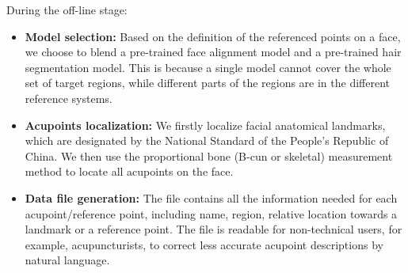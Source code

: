 During the off-line stage:
\begin{itemize}
\item \textbf{Model selection:} Based on the definition of the referenced points on a face, we choose to blend a pre-trained face alignment model and a pre-trained hair segmentation model. This is because a single model cannot cover the whole set of target regions, while different parts of the regions are in the different reference systems.
\item \textbf{Acupoints localization:} We firstly localize facial anatomical landmarks, which are designated by the National Standard of the People’s Republic of China. We then use the proportional bone (B-cun or skeletal) measurement method to locate all acupoints on the face.
\item \textbf{Data file generation:} The file contains all the information needed for each acupoint/reference point, including name, region, relative location towards a landmark or a reference point. The file is readable for non-technical users, for example, acupuncturists, to correct less accurate acupoint descriptions by natural language.
\end{itemize}

